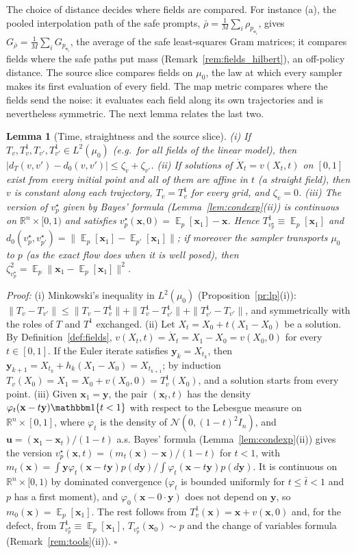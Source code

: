 \documentclass{article}
\DeclareMathOperator{\E}{\mathbb{E}}
\newcommand{\RR}{\mathbb{R}}
\newcommand{\cN}{\mathcal{N}}
\newcommand{\bx}{\mathbf{x}}
\newcommand{\by}{\mathbf{y}}
\newcommand{\bu}{\mathbf{u}}
\newcommand{\be}{\mathbf{e}}
\newcommand{\vstar}{v^{\star}}
\theoremstyle{plain}
\newtheorem{lemma}[theorem]{Lemma}
\theoremstyle{remark}
\begin{document}
The choice of distance decides where fields are compared. For instance (a), the pooled
interpolation path of the safe prompts, $\bar\rho=\frac1M\sum_i\rho_{p_{\be_i}}$, gives
$G_{\bar\rho}=\frac1M\sum_iG_{p_{\be_i}}$, the average of the safe least-squares Gram matrices; it
compares fields where the safe paths put mass (Remark~\ref{rem:fields_hilbert}), an off-policy distance. The source slice compares
fields on $\mu_0$, the law at which every sampler makes its first evaluation of every field. The map metric
compares where the fields send the noise: it evaluates each field along its own trajectories and
is nevertheless symmetric. The next lemma relates the last two.

\begin{lemma}[Time, straightness and the source slice]\label{lem:time}
(i) If $T_v,T^1_v,T_{v'},T^1_{v'}\in L^2(\mu_0)$ (e.g.\ for all fields of the linear model), then
$|d_T(v,v')-d_0(v,v')|\le\zeta_v+\zeta_{v'}$.
(ii) If solutions of $\dot X_t=v(X_t,t)$ on $[0,1]$ exist from every initial point and all of them are
affine in $t$ (a \emph{straight} field), then $v$ is constant along each trajectory, $T_v=T^1_v$ for
every grid, and $\zeta_v=0$.
(iii) The version of $\vstar_p$ given by Bayes' formula (Lemma~\ref{lem:condexp}(ii)) is continuous on $\RR^n\times[0,1)$ and
satisfies $\vstar_p(\bx,0)=\E_p[\bx_1]-\bx$. Hence $T^1_{\vstar_p}\equiv\E_p[\bx_1]$ and
$d_0(\vstar_p,\vstar_{p'})=\|\E_p[\bx_1]-\E_{p'}[\bx_1]\|$; if moreover the sampler transports $\mu_0$ to $p$
(as the exact flow does when it is well posed), then $\zeta_{\vstar_p}^2=\E_p\|\bx_1-\E_p[\bx_1]\|^2$.
\end{lemma}
\textit{Proof:}
(i) Minkowski's inequality in $L^2(\mu_0)$ (Proposition~\ref{pr:lp}(i)): $\|T_v-T_{v'}\|\le\|T_v-T^1_v\|+\|T^1_v-T^1_{v'}\|+\|T^1_{v'}-T_{v'}\|$,
and symmetrically with the roles of $T$ and $T^1$ exchanged.
(ii) Let $X_t=X_0+t(X_1-X_0)$ be a solution. By Definition~\ref{def:fields}, $v(X_t,t)=\dot X_t=X_1-X_0=v(X_0,0)$ for every $t\in[0,1]$.
If the Euler iterate satisfies $\by_k=X_{t_k}$, then $\by_{k+1}=X_{t_k}+h_k(X_1-X_0)=X_{t_{k+1}}$; by induction
$T_v(X_0)=X_1=X_0+v(X_0,0)=T^1_v(X_0)$, and a solution starts from every point.
(iii) Given $\bx_1=\by$, the pair $(\bx_t,t)$ has the density $\varphi_t(\bx-t\by)\mathbbm 1\{t<1\}$ with respect to the Lebesgue measure on
$\RR^n\times[0,1]$, where $\varphi_t$ is the density of $\cN(0,(1-t)^2I_n)$, and $\bu=(\bx_1-\bx_t)/(1-t)$ a.s. Bayes' formula
(Lemma~\ref{lem:condexp}(ii)) gives the version $\vstar_p(\bx,t)=(m_t(\bx)-\bx)/(1-t)$ for $t<1$, with
$m_t(\bx)=\int\by\varphi_t(\bx-t\by)p(d\by)/\int\varphi_t(\bx-t\by)p(d\by)$. It is continuous on $\RR^n\times[0,1)$ by dominated convergence
($\varphi_t$ is bounded uniformly for $t\le\bar t<1$ and $p$ has a first moment), and $\varphi_0(\bx-0\cdot\by)$ does not depend on $\by$, so
$m_0(\bx)=\E_p[\bx_1]$. The rest follows from $T^1_v(\bx)=\bx+v(\bx,0)$ and, for the defect, from $T^1_{\vstar_p}\equiv\E_p[\bx_1]$,
$T_{\vstar_p}(\bx_0)\sim p$ and the change of variables formula (Remark~\ref{rem:tools}(ii)). \hfill$\square$
\end{document}
